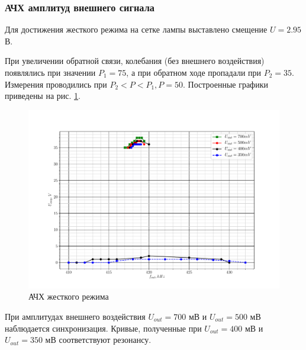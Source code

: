 \subsubsection*{АЧХ амплитуд внешнего сигнала}

Для достижения жесткого режима на сетке лампы выставлено смещение $U =  2.95$ В.

При увеличении обратной связи, колебания (без внешнего воздействия) появлялись при значении $P_1 = 75$, а при обратном
ходе пропадали при $P_2 = 35$. Измерения проводились при $P_2 < P <P_1, P = 50$. Построенные графики приведены на рис. \ref{fig:hard}. 

\begin{figure}[h!]
	\centering
	\includegraphics[width = .95\linewidth]{graphs/hard.pdf}
	\caption{АЧХ жесткого режима}
	\label{fig:hard}
\end{figure}

При амплитудах внешнего воздействия $U_{out} = 700$ мВ и $U_{out} = 500$ мВ наблюдается синхронизация. Кривые,
полученные при $U_{out} = 400$ мВ и $U_{out} = 350$ мВ соответствуют резонансу.


